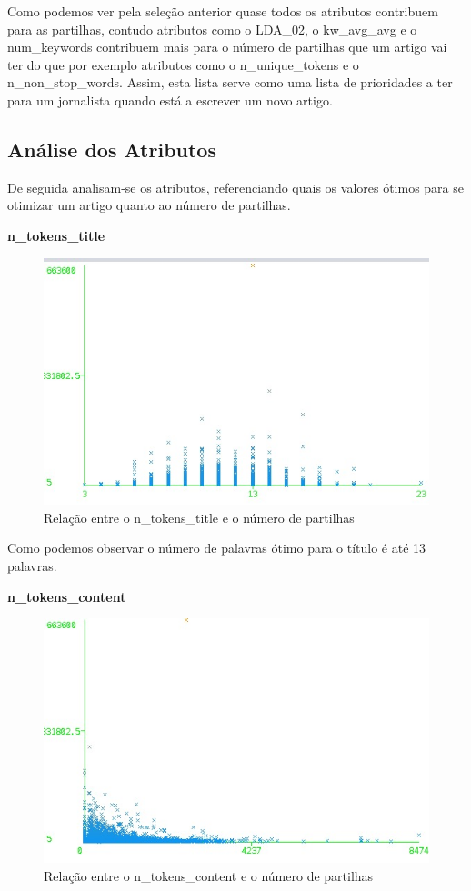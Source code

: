 Como podemos ver pela seleção anterior quase todos os atributos contribuem para as partilhas, contudo atributos como o LDA\_02, o kw\_avg\_avg e o num\_keywords contribuem mais para o número de partilhas que um artigo vai ter do que por exemplo atributos como o n\_unique\_tokens e o n\_non\_stop\_words. Assim, esta lista serve como uma lista de prioridades a ter para um jornalista quando está a escrever um novo artigo.

\subsection{Análise dos Atributos}

De seguida analisam-se os atributos, referenciando quais os valores ótimos para se otimizar um artigo quanto ao número de partilhas.

\textbf{n\_tokens\_title}

\begin{figure}[H]
    \centering
    \includegraphics[scale=0.6]{tex/img/graph1.jpg}
    \caption{Relação entre o n\_tokens\_title e o número de partilhas}
    \label{fig:tokensTitles}
\end{figure}
Como podemos observar o número de palavras ótimo para o título é até 13 palavras.

\textbf{n\_tokens\_content}

\begin{figure}[H]
    \centering
    \includegraphics[scale=0.6]{tex/img/graph2.jpg}
    \caption{Relação entre o n\_tokens\_content e o número de partilhas}
    \label{fig:tokensTitles2}
\end{figure}


